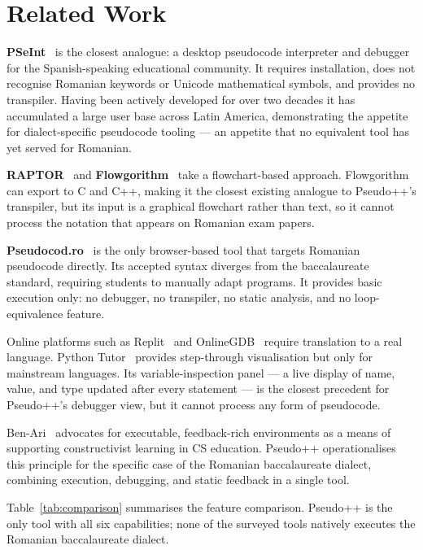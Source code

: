 \documentclass[conference]{IEEEtran}
\begin{document}
\section{Related Work}
\label{sec:related}

\textbf{PSeInt}~\cite{psint} is the closest analogue: a desktop pseudocode
interpreter and debugger for the Spanish-speaking educational community.  It
requires installation, does not recognise Romanian keywords or Unicode
mathematical symbols, and provides no transpiler.  Having been actively
developed for over two decades it has accumulated a large user base across
Latin America, demonstrating the appetite for dialect-specific pseudocode
tooling --- an appetite that no equivalent tool has yet served for Romanian.

\textbf{RAPTOR}~\cite{raptor} and \textbf{Flowgorithm}~\cite{flowgorithm} take
a flowchart-based approach.  Flowgorithm can export to C and C++, making it
the closest existing analogue to Pseudo++'s transpiler, but its input is a
graphical flowchart rather than text, so it cannot process the notation that
appears on Romanian exam papers.

\textbf{Pseudocod.ro}~\cite{pseudocodro} is the only browser-based tool that
targets Romanian pseudocode directly.  Its accepted syntax diverges from the
baccalaureate standard, requiring students to manually adapt programs.  It
provides basic execution only: no debugger, no transpiler, no static analysis,
and no loop-equivalence feature.

Online platforms such as Replit~\cite{replit} and OnlineGDB~\cite{onlinegdb}
require translation to a real language.  Python Tutor~\cite{pythontutor}
provides step-through visualisation but only for mainstream languages.  Its
variable-inspection panel --- a live display of name, value, and type updated
after every statement --- is the closest precedent for Pseudo++'s debugger
view, but it cannot process any form of pseudocode.

Ben-Ari~\cite{benari2001} advocates for executable, feedback-rich environments
as a means of supporting constructivist learning in CS education.  Pseudo++
operationalises this principle for the specific case of the Romanian
baccalaureate dialect, combining execution, debugging, and static feedback in a
single tool.

Table~\ref{tab:comparison} summarises the feature comparison.
Pseudo++ is the only tool with all six capabilities; none of the surveyed tools
natively executes the Romanian baccalaureate dialect.
\end{document}
